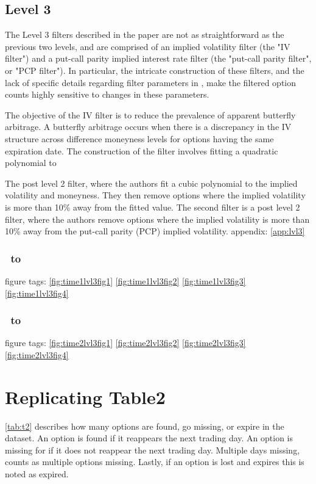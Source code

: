 \subsection{Level 3} 

The Level 3 filters described in the paper are not as straightforward as the previous two levels, and are comprised of an implied volatility filter (the "IV filter") and a put-call parity implied interest rate filter (the "put-call parity filter", or "PCP filter"). In particular, the intricate construction of these filters, and the lack of specific details regarding filter parameters in , make the filtered option counts highly sensitive to changes in these parameters.

The objective of the IV filter is to reduce the prevalence of apparent butterfly arbitrage. A butterfly arbitrage occurs when there is a discrepancy in the IV structure across difference moneyness levels for options having the same expiration date. The construction of the filter involves fitting a quadratic polynomial to 

The  post level 2 filter, where the authors fit a cubic polynomial to the implied volatility and moneyness. They then remove options where the implied volatility is more than 10\% away from the fitted value. The second filter is a post level 2 filter, where the authors remove options where the implied volatility is more than 10\% away from the put-call parity (PCP) implied volatility.
appendix: \autoref{app:lvl3}


\subsubsection{\STARTONE\ to \ENDONE }
figure tags: 
\autoref{fig:time1lvl3fig1}
\autoref{fig:time1lvl3fig2}
\autoref{fig:time1lvl3fig3}
\autoref{fig:time1lvl3fig4}
\subsubsection{\STARTTWO\ to \ENDTWO }
figure tags: 
\autoref{fig:time2lvl3fig1}
\autoref{fig:time2lvl3fig2}
\autoref{fig:time2lvl3fig3}
\autoref{fig:time2lvl3fig4}











\section{Replicating Table2}
\autoref{tab:t2} describes how many options are found, go missing, or expire in the dataset. An option is found if it reappears the next trading day. An option is missing for if it does not reappear the next trading day. Multiple days missing, counts as multiple options missing. Lastly, if an option is lost and expires this is noted as expired. 

